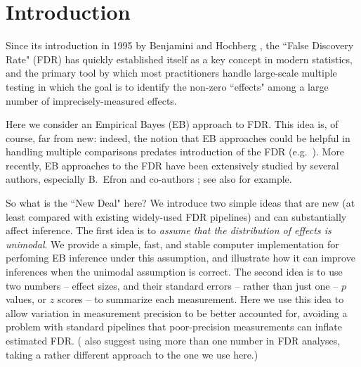 \documentclass[11pt]{article}
\begin{document}

\section*{Introduction}

Since its introduction in 1995 by Benjamini and Hochberg 
\cite{benjamini1995controlling}, the ``False Discovery Rate" (FDR) has quickly established itself
as a key concept in modern statistics, and the primary tool by which most practitioners handle large-scale multiple testing
in which the goal is to identify the non-zero ``effects" among a large number of imprecisely-measured effects.

Here we consider an Empirical Bayes (EB) approach to FDR. This idea is, of course, far from new:
indeed, the notion that EB approaches could be helpful in handling multiple comparisons predates introduction of
the FDR  (e.g.~\cite{greenland1991empirical}). More recently, EB approaches to the FDR
have been extensively studied by several authors, 
especially B.~Efron and co-authors 
\cite{efron2001empirical, efron2002empirical,efron2003robbins,efron2008microarrays,efron2010large}; 
see also \cite{kendziorski2003parametric,newton2004detecting, 
datta2005empirical,muralidharan2010empirical} for example.

So what is the ``New Deal" here? We introduce two simple ideas that are new (at least compared with
existing widely-used FDR pipelines) and can substantially affect
inference. The first idea is to {\it assume that the distribution of effects is unimodal}.  We provide a simple, fast, and stable computer 
implementation for perfoming EB inference under this assumption, and illustrate how it can improve inferences 
when the unimodal assumption is correct.  
The second idea is to use two numbers -- effect sizes, and their standard errors -- rather than just one -- $p$ values, or $z$ scores -- 
to summarize each measurement. Here we use this idea to allow variation in measurement precision to be better accounted for,
 avoiding a problem with standard pipelines that poor-precision measurements can inflate estimated FDR.
(\cite{ploner2006multidimensional} also suggest using more than one number in FDR analyses, taking a
rather different approach to the one we use here.)
\end{document}
